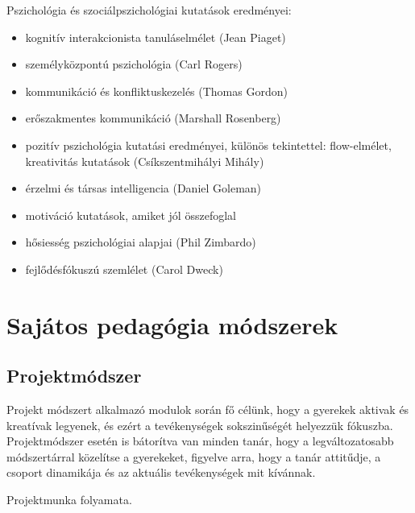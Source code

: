 Pszichológia és szociálpszichológiai kutatások eredményei:

\begin{itemize}

\item
  kognitív interakcionista tanuláselmélet (Jean Piaget)
\item
  személyközpontú pszichológia (Carl Rogers)
\item
  kommunikáció és konfliktuskezelés (Thomas Gordon)
\item
  erőszakmentes kommunikáció (Marshall Rosenberg)
\item
  pozitív pszichológia kutatási eredményei, különös tekintettel:
  flow-elmélet, kreativitás kutatások (Csíkszentmihályi Mihály)
\item
  érzelmi és társas intelligencia (Daniel Goleman)
\item motiváció kutatások, amiket jól összefoglal \citep{pink2011drive}
\item
  hősiesség pszichológiai alapjai (Phil Zimbardo)
\item
  fejlődésfókuszú szemlélet (Carol Dweck)
\end{itemize}

\section{Sajátos pedagógia
módszerek}
\subsection{Projektmódszer}
Projekt módszert alkalmazó modulok során fő célünk, hogy a gyerekek aktivak és kreatívak legyenek, és ezért a tevékenységek sokszinűségét helyezzük fókuszba. Projektmódszer esetén is bátorítva van minden tanár, hogy a legváltozatosabb módszertárral közelítse a gyerekeket, figyelve arra, hogy a tanár attitűdje, a csoport dinamikája és az aktuális tevékenységek mit kívánnak.

Projektmunka folyamata.

